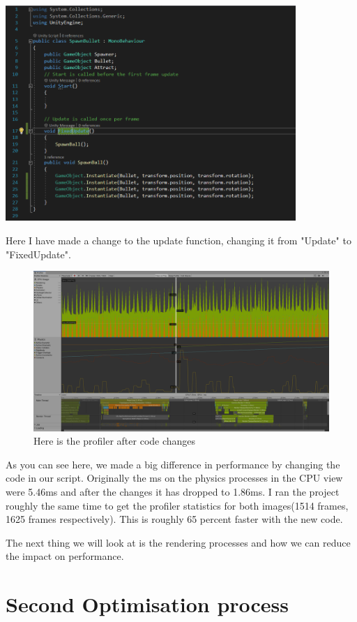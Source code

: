 \documentclass{article}
\begin{document}
\includegraphics[width=11cm]{images/code2.png}\par
Here I have made a change to the update function, changing it from "Update" to "FixedUpdate".
\newpage

\begin{figure}
    \centering
    \includegraphics[width=15cm]{images/profiler1.png}
    \caption{Here is the profiler after code changes}
\end{figure}
As you can see here, we made a big difference in performance by changing the code in our script. Originally the ms on the physics processes in the CPU view were 5.46ms and after the changes it has dropped to 1.86ms. I ran the project roughly the same time to get the profiler statistics for both images(1514 frames, 1625 frames respectively). This is roughly 65 percent faster with the new code.

The next thing we will look at is the rendering processes and how we can reduce the impact on performance.
\newpage

\section{Second Optimisation process}
\end{document}
